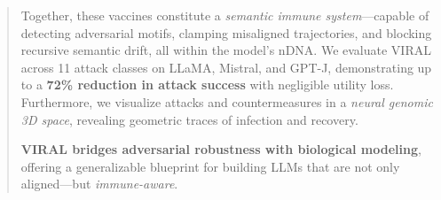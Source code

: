 \documentclass[11pt]{article}
\begin{document}
\begin{abstract}
Together, these vaccines constitute a \emph{semantic immune system}—capable of detecting adversarial motifs, clamping misaligned trajectories, and blocking recursive semantic drift, all within the model’s nDNA. We evaluate VIRAL across 11 attack classes on LLaMA, Mistral, and GPT-J, demonstrating up to a \textbf{72\% reduction in attack success} with negligible utility loss. Furthermore, we visualize attacks and countermeasures in a \textit{neural genomic 3D space}, revealing geometric traces of infection and recovery.

\textbf{VIRAL bridges adversarial robustness with biological modeling}, offering a generalizable blueprint for building LLMs that are not only aligned—but \emph{immune-aware}.
\end{abstract}















%
%


%
%
%



\clearpage
\newpage


\end{document}
